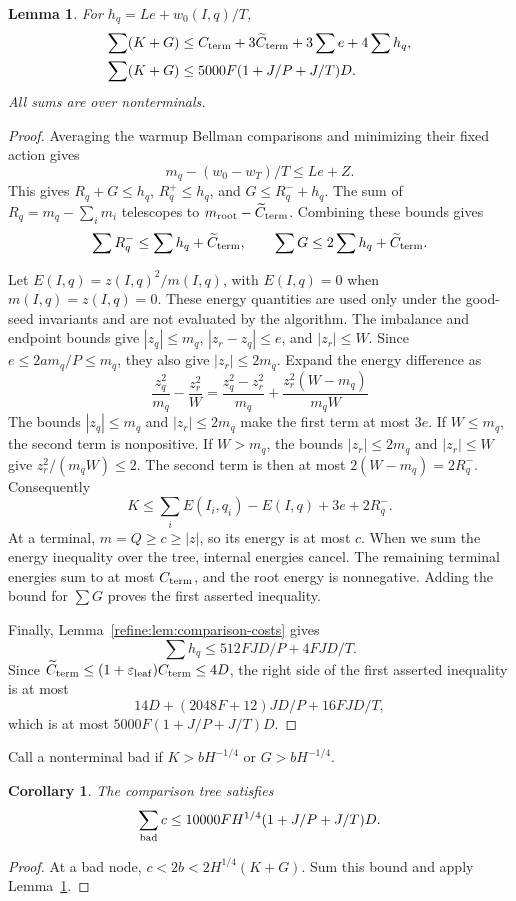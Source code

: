 \documentclass[11pt]{article}
\newtheorem{lemma}[theorem]{Lemma}
\newtheorem{corollary}[theorem]{Corollary}
\theoremstyle{definition}
\newcommand{\1}{\mathbf 1}
\begin{document}
\begin{lemma}\label{refine:lem:curvature}
For $h_q=Le+w_0(I,q)/T$,
\begin{align*}
 \sum(K+G)&\le C_{\rm term}+3\widetilde C_{\rm term}
                   +3\sum e+4\sum h_q,\\
 \sum(K+G)&\le5000F(1+J/P+J/T)D.
\end{align*}
All sums are over nonterminals.
\end{lemma}
\begin{proof}
Averaging the warmup Bellman comparisons and minimizing their fixed action gives
\[
 m_q-(w_0-w_T)/T\le Le+Z.
\]
This gives $R_q+G\le h_q$, $R_q^+\le h_q$, and
$G\le R_q^-+h_q$.
The sum of $R_q=m_q-\sum_i m_i$ telescopes to
$m_{\rm root}-\widetilde C_{\rm term}$.
Combining these bounds gives
\[
 \sum R_q^-\le\sum h_q+\widetilde C_{\rm term},
 \qquad \sum G\le2\sum h_q+\widetilde C_{\rm term}.
\]

Let $E(I,q)=z(I,q)^2/m(I,q)$, with $E(I,q)=0$ when $m(I,q)=z(I,q)=0$.
These energy quantities are used only under the good-seed invariants
and are not evaluated by the algorithm.
The imbalance and endpoint bounds give
$|z_q|\le m_q$, $|z_r-z_q|\le e$, and $|z_r|\le W$.
Since $e\le2am_q/P\le m_q$, they also give $|z_r|\le2m_q$.
Expand the energy difference as
\[
 \frac{z_q^2}{m_q}-\frac{z_r^2}{W}
 =\frac{z_q^2-z_r^2}{m_q}+
   \frac{z_r^2(W-m_q)}{m_qW}
\]
The bounds $|z_q|\le m_q$ and $|z_r|\le2m_q$ make the first term
at most $3e$. If $W\le m_q$, the second term is nonpositive.
If $W>m_q$, the bounds $|z_r|\le2m_q$ and $|z_r|\le W$ give
$z_r^2/(m_qW)\le2$. The second term is then at most
$2(W-m_q)=2R_q^-$.
Consequently
\[
 K\le\sum_i E(I_i,q_i)-E(I,q)+3e+2R_q^-.
\]
At a terminal, $m=Q\ge c\ge|z|$, so its energy is at most $c$.
When we sum the energy inequality over the tree, internal energies
cancel. The remaining terminal energies sum to at most $C_{\rm term}$,
and the root energy is nonnegative.
Adding the bound for $\sum G$ proves
the first asserted inequality.

Finally, Lemma~\ref{refine:lem:comparison-costs} gives
\[
 \sum h_q\le512FJD/P+4FJD/T.
\]
Since $\widetilde C_{\rm term}\le(1+\varepsilon_{\rm leaf})C_{\rm term}\le4D$, the right side of the first asserted inequality is at most
\[
 14D+(2048F+12)JD/P+16FJD/T,
\]
which is at most $5000F(1+J/P+J/T)D$.
\end{proof}

Call a nonterminal bad if $K>bH^{-1/4}$ or $G>bH^{-1/4}$.

\begin{corollary}\label{refine:cor:badcost}
The comparison tree satisfies
\[
 \sum_{\rm bad}c\le
 10000FH^{1/4}(1+J/P+J/T)D.
\]
\end{corollary}
\begin{proof}
At a bad node, $c<2b<2H^{1/4}(K+G)$.
Sum this bound and apply Lemma~\ref{refine:lem:curvature}.
\end{proof}
\end{document}
